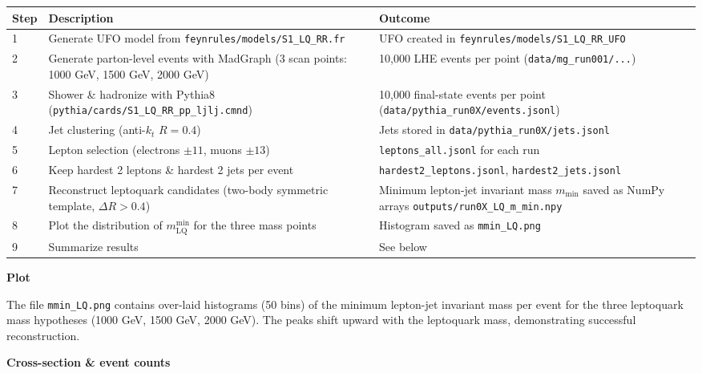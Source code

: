 \documentclass[11pt,oneside]{article}
\numberwithin{equation}{section}
\begin{document}
\begin{orchestralagentmessage}
    \begin{center}
    \begin{tabularx}{\textwidth}{p{1cm} X X}
    \hline
    \textbf{Step} & \textbf{Description} & \textbf{Outcome} \\
    \hline
    1 & Generate UFO model from \texttt{feynrules/models/S1\_LQ\_RR.fr} & UFO created in \texttt{feynrules/models/S1\_LQ\_RR\_UFO} \\
    2 & Generate parton-level events with MadGraph (3 scan points: 1000 GeV, 1500 GeV, 2000 GeV) & 10,000 LHE events per point (\texttt{data/mg\_run001/...}) \\
    3 & Shower \& hadronize with Pythia8 (\texttt{pythia/cards/S1\_LQ\_RR\_pp\_ljlj.cmnd}) & 10,000 final-state events per point (\texttt{data/pythia\_run0X/events.jsonl}) \\
    4 & Jet clustering (anti-$k_t$ $R=0.4$) & Jets stored in \texttt{data/pythia\_run0X/jets.jsonl} \\
    5 & Lepton selection (electrons $\pm 11$, muons $\pm 13$) & \texttt{leptons\_all.jsonl} for each run \\
    6 & Keep hardest 2 leptons \& hardest 2 jets per event & \texttt{hardest2\_leptons.jsonl}, \texttt{hardest2\_jets.jsonl} \\
    7 & Reconstruct leptoquark candidates (two-body symmetric template, $\Delta R > 0.4$) & Minimum lepton-jet invariant mass $m_{\text{min}}$ saved as NumPy arrays \texttt{outputs/run0X\_LQ\_m\_min.npy} \\
    8 & Plot the distribution of $m^{\text{min}}_{\text{LQ}}$ for the three mass points & Histogram saved as \texttt{mmin\_LQ.png} \\
    9 & Summarize results & See below \\
    \hline
    \end{tabularx}
    \end{center}
    \vspace{0.1in}
    
    \textbf{Plot}

    \vspace{0.1in}
    The file \texttt{mmin\_LQ.png} contains over-laid histograms (50 bins) of the minimum lepton-jet invariant mass per event for the three leptoquark mass hypotheses (1000 GeV, 1500 GeV, 2000 GeV). The peaks shift upward with the leptoquark mass, demonstrating successful reconstruction.

    \vspace{0.1in}
    \textbf{Cross-section \& event counts}\\


\end{orchestralagentmessage}
\end{document}
